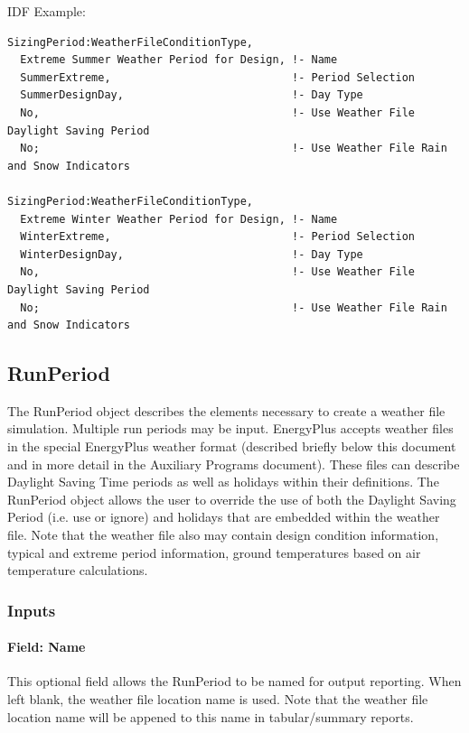 IDF Example:

\begin{lstlisting}
SizingPeriod:WeatherFileConditionType,
  Extreme Summer Weather Period for Design, !- Name
  SummerExtreme,                            !- Period Selection
  SummerDesignDay,                          !- Day Type
  No,                                       !- Use Weather File Daylight Saving Period
  No;                                       !- Use Weather File Rain and Snow Indicators

SizingPeriod:WeatherFileConditionType,
  Extreme Winter Weather Period for Design, !- Name
  WinterExtreme,                            !- Period Selection
  WinterDesignDay,                          !- Day Type
  No,                                       !- Use Weather File Daylight Saving Period
  No;                                       !- Use Weather File Rain and Snow Indicators
\end{lstlisting}

\subsection{RunPeriod}\label{runperiod}

The RunPeriod object describes the elements necessary to create a weather file simulation. Multiple run periods may be input. EnergyPlus accepts weather files in the special EnergyPlus weather format (described briefly below this document and in more detail in the Auxiliary Programs document). These files can describe Daylight Saving Time periods as well as holidays within their definitions. The RunPeriod object allows the user to override the use of both the Daylight Saving Period (i.e. use or ignore) and holidays that are embedded within the weather file. Note that the weather file also may contain design condition information, typical and extreme period information, ground temperatures based on air temperature calculations.

\subsubsection{Inputs}\label{inputs-4-018}

\paragraph{Field: Name}\label{field-name-4-015}

This optional field allows the RunPeriod to be named for output reporting. When left blank, the weather file location name is used. Note that the weather file location name will be appened to this name in tabular/summary reports.

